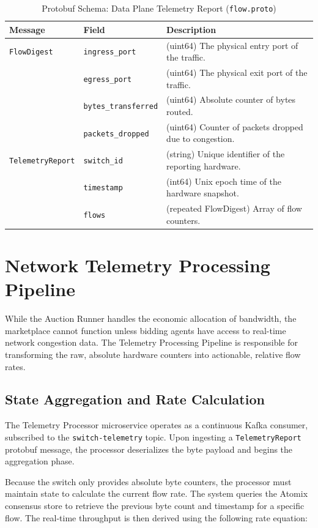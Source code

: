 \begin{table}[H]
\centering
\caption{Protobuf Schema: Data Plane Telemetry Report (\texttt{flow.proto})}
\label{tab:proto_flow}
\begin{tabular}{llp{8cm}}
\toprule
\textbf{Message} & \textbf{Field} & \textbf{Description} \\
\midrule
\texttt{FlowDigest} & \texttt{ingress\_port} & (uint64) The physical entry port of the traffic. \\
& \texttt{egress\_port} & (uint64) The physical exit port of the traffic. \\
& \texttt{bytes\_transferred} & (uint64) Absolute counter of bytes routed. \\
& \texttt{packets\_dropped} & (uint64) Counter of packets dropped due to congestion. \\
\midrule
\texttt{TelemetryReport} & \texttt{switch\_id} & (string) Unique identifier of the reporting hardware. \\
& \texttt{timestamp} & (int64) Unix epoch time of the hardware snapshot. \\
& \texttt{flows} & (repeated FlowDigest) Array of flow counters. \\
\bottomrule
\end{tabular}
\end{table}

\section{Network Telemetry Processing Pipeline}

While the Auction Runner handles the economic allocation of bandwidth, the marketplace cannot function unless bidding agents have access to real-time network congestion data. The Telemetry Processing Pipeline is responsible for transforming the raw, absolute hardware counters into actionable, relative flow rates.

\subsection{State Aggregation and Rate Calculation}
The Telemetry Processor microservice operates as a continuous Kafka consumer, subscribed to the \texttt{switch-telemetry} topic. Upon ingesting a \texttt{TelemetryReport} protobuf message, the processor deserializes the byte payload and begins the aggregation phase.

Because the switch only provides absolute byte counters, the processor must maintain state to calculate the current flow rate. The system queries the Atomix consensus store to retrieve the previous byte count and timestamp for a specific flow. The real-time throughput is then derived using the following rate equation:

